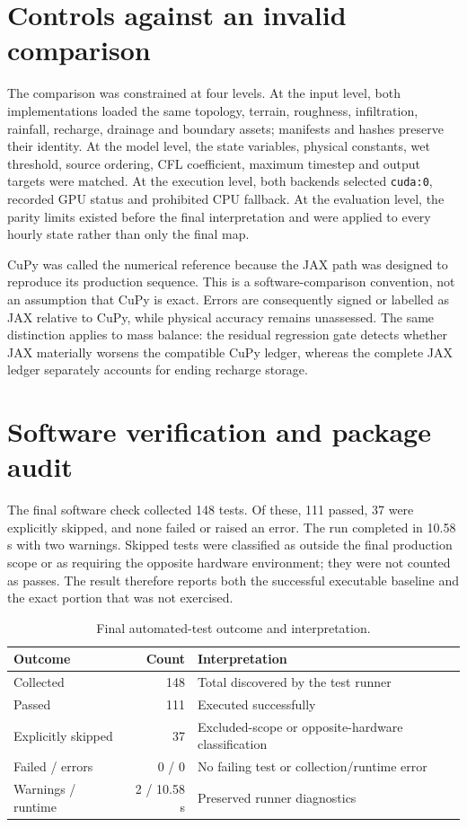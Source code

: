 \documentclass[11pt,a4paper,oneside]{report}
\begin{document}
\section{Controls against an invalid comparison}
The comparison was constrained at four levels. At the input level, both implementations
loaded the same topology, terrain, roughness, infiltration, rainfall, recharge, drainage and
boundary assets; manifests and hashes preserve their identity. At the model level, the state
variables, physical constants, wet threshold, source ordering, CFL coefficient, maximum
timestep and output targets were matched. At the execution level, both backends selected
\texttt{cuda:0}, recorded GPU status and prohibited CPU fallback. At the evaluation level,
the parity limits existed before the final interpretation and were applied to every hourly
state rather than only the final map.

CuPy was called the numerical reference because the JAX path was designed to reproduce its
production sequence. This is a software-comparison convention, not an assumption that CuPy
is exact. Errors are consequently signed or labelled as JAX relative to CuPy, while physical
accuracy remains unassessed. The same distinction applies to mass balance: the residual
regression gate detects whether JAX materially worsens the compatible CuPy ledger, whereas
the complete JAX ledger separately accounts for ending recharge storage.


\section{Software verification and package audit}
The final software check collected 148 tests. Of these, 111 passed, 37 were explicitly
skipped, and none failed or raised an error. The run completed in 10.58 s with two warnings.
Skipped tests were classified as outside the final production scope or as requiring the
opposite hardware environment; they were not counted as passes. The result therefore reports both
the successful executable baseline and the exact portion that was not exercised.

\begin{table}[H]
\centering
\caption[Final automated-test outcome.]{Final automated-test outcome and interpretation.}
\label{tab:tests}
\small
\begin{tabular}{|l|r|l|}
\hline
\textbf{Outcome} & \textbf{Count} & \textbf{Interpretation} \\
\hline\hline
Collected & 148 & Total discovered by the test runner \\ \hdashline[0.4pt/1.2pt]
Passed & 111 & Executed successfully \\ \hdashline[0.4pt/1.2pt]
Explicitly skipped & 37 & Excluded-scope or opposite-hardware classification \\ \hdashline[0.4pt/1.2pt]
Failed / errors & 0 / 0 & No failing test or collection/runtime error \\ \hdashline[0.4pt/1.2pt]
Warnings / runtime & 2 / 10.58 s & Preserved runner diagnostics \\
\hline
\end{tabular}
\end{table}
\end{document}
